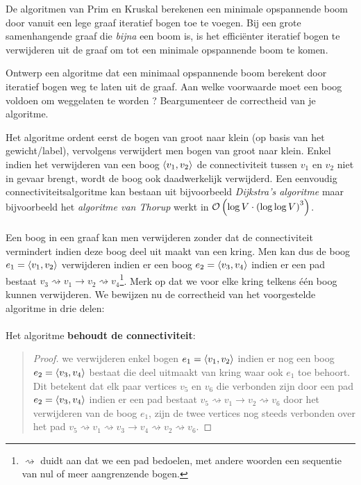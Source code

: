 \documentclass{article}
\begin{document}
\begin{question}
De algoritmen van Prim en Kruskal berekenen een minimale opspannende
boom door vanuit een lege graaf iteratief bogen toe te voegen. Bij een
grote samenhangende graaf die {\em bijna} een boom is, is het
effici\"{e}nter iteratief bogen te verwijderen uit de graaf om tot een
minimale opspannende boom te komen.

Ontwerp een algoritme dat een minimaal opspannende boom berekent door
iteratief bogen weg te laten uit de graaf. Aan welke voorwaarde moet
een boog voldoen om weggelaten te worden ? Beargumenteer de correctheid
van je algoritme.
\begin{answer}
Het algoritme ordent eerst de bogen van groot naar klein (op basis van het gewicht/label),
vervolgens verwijdert men bogen van groot naar klein. Enkel indien het verwijderen
van een boog $\left\langle v_1,v_2 \right\rangle$ de connectiviteit tussen $v_1$ en $v_2$ niet in
gevaar brengt, wordt de boog ook daadwerkelijk verwijderd. Een eenvoudig connectiviteitsalgoritme
kan bestaan uit bijvoorbeeld \emph{Dijkstra's algoritme} maar bijvoorbeeld het \emph{algoritme van Thorup}
werkt in $\mathcal{O}\left( \log V\cdot\left( \log\log V \right)^3 \right)$.
\paragraph{}
Een boog in een graaf kan men verwijderen zonder dat de connectiviteit vermindert indien deze boog deel
uit maakt van een kring. Men kan dus de boog $e_1=\left\langle v_1,v_2 \right\rangle$ verwijderen indien er een boog $e_2=\left\langle v_3,v_4 \right\rangle$ indien
er een pad bestaat $v_3\rightsquigarrow v_1\rightarrow v_2\rightsquigarrow v_4$\footnote{$\rightsquigarrow$ duidt aan dat we een pad bedoelen, met andere woorden een sequentie van nul of meer aangrenzende bogen.}. Merk op dat we voor elke kring telkens \'e\'en boog kunnen verwijderen. We bewijzen nu de correctheid van het voorgestelde algoritme in drie delen:
\paragraph{}
Het algoritme \textbf{behoudt de connectiviteit}:
\begin{quote}\begin{proof}
we verwijderen enkel bogen $e_1=\left\langle v_1,v_2 \right\rangle$ indien er nog een boog $e_2=\left\langle v_3,v_4 \right\rangle$ bestaat die deel uitmaakt van kring waar ook $e_1$ toe behoort. Dit betekent dat elk paar vertices $v_5$ en $v_6$ die verbonden zijn door een pad $e_2=\left\langle v_3,v_4 \right\rangle$ indien er een pad bestaat $v_5\rightsquigarrow v_1\rightarrow v_2\rightsquigarrow v_6$ door het verwijderen van de boog $e_1$, zijn de
twee vertices nog steeds verbonden over het pad $v_5\rightsquigarrow v_1\rightsquigarrow v_3\rightarrow v_4\rightsquigarrow v_2\rightsquigarrow v_6$.
\end{proof}\end{quote}

\end{answer}
\end{question}
\end{document}

